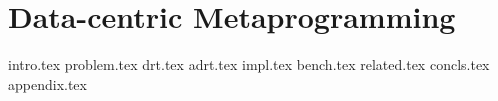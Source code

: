 \chapter{Data-centric Metaprogramming}
\label{chapter:ildl}

{intro.tex}
{problem.tex}
{drt.tex}
{adrt.tex}
{impl.tex}
{bench.tex}
{related.tex}
{concls.tex}
\newpage
{appendix.tex}
